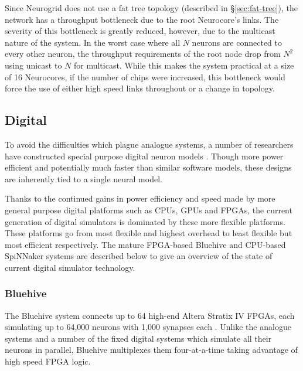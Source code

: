 				Since Neurogrid does not use a fat tree topology (described in
				\S\ref{sec:fat-tree}), the network has a throughput bottleneck due to
				the root Neurocore's links. The severity of this bottleneck is greatly
				reduced, however, due to the multicast nature of the system. In the
				worst case where all $N$ neurons are connected to every other neuron,
				the throughput requirements of the root node drop from $N^2$ using
				unicast to $N$ for multicast. While this makes the system practical at a
				size of 16 Neurocores, if the number of chips were increased, this
				bottleneck would force the use of either high speed links throughout or
				a change in topology.
			
			
		\subsection{Digital}
			
			
			To avoid the difficulties which plague analogue systems, a number of
			researchers have constructed special purpose digital neuron models
			\cite{prange93,jahnke96,schoenauer99,mehrtash03}. Though more power
			efficient and potentially much faster than similar software models, these
			designs are inherently tied to a single neural model.
			
			Thanks to the continued gains in power efficiency and speed made by more
			general purpose digital platforms such as CPUs, GPUs and FPGAs, the
			current generation of digital simulators is dominated by these more
			flexible platforms. These platforms go from most flexible and highest
			overhead to least flexible but most efficient respectively.  The mature
			FPGA-based Bluehive and CPU-based SpiNNaker systems are described below to
			give an overview of the state of current digital simulator technology.
			
			\subsubsection{Bluehive}
				
				The Bluehive system connects up to 64 high-end Altera Stratix IV FPGAs,
				each simulating up to 64,000 neurons with 1,000 synapses each
				\cite{moore12}. Unlike the analogue systems and a number of the fixed
				digital systems which simulate all their neurons in parallel, Bluehive
				multiplexes them four-at-a-time taking advantage of high speed FPGA
				logic.
				
